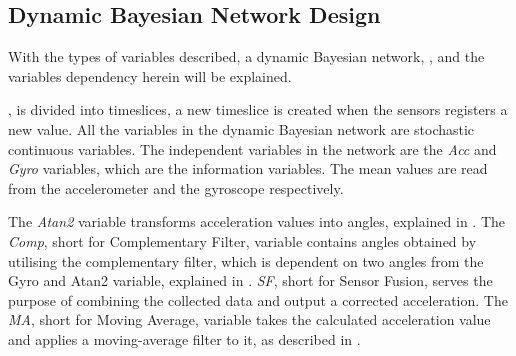 \subsection{Dynamic Bayesian Network Design}\label{section:dynamic-bayesian-network}

With the types of variables described, a dynamic Bayesian network, , and the variables dependency herein will be explained.

, is divided into timeslices, a new timeslice is created when the sensors registers a new value. 
All the variables in the dynamic Bayesian network are stochastic continuous variables.
The independent variables in the network are the \textit{Acc} and \textit{Gyro} variables, which are the information variables.
The mean values are read from the accelerometer and the gyroscope respectively. 

The \textit{Atan2} variable transforms acceleration values into angles, explained in .
The \textit{Comp}, short for Complementary Filter, variable contains angles obtained by utilising the complementary filter, which is dependent on two angles from the Gyro and Atan2 variable, explained in .
\textit{SF}, short for Sensor Fusion, serves the purpose of combining the collected data and output a corrected acceleration.
The \textit{MA}, short for Moving Average, variable takes the calculated acceleration value and applies a moving-average filter to it, as described in .

